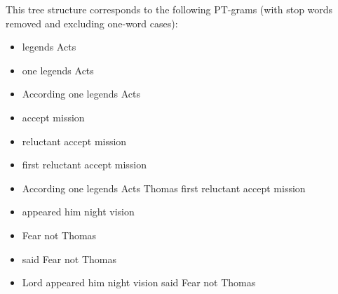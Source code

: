 \documentclass[12pt]{article}
\begin{document}
This tree structure corresponds to the following PT-grams
(with stop words removed and excluding one-word cases):

\begin{itemize}
\item legends Acts
\item one legends Acts
\item According one legends Acts
\item accept mission
\item reluctant accept mission
\item first reluctant accept mission 
\item According one legends Acts Thomas first reluctant accept mission 
\item appeared him night vision
\item Fear not Thomas
\item said Fear not Thomas
\item Lord appeared him night vision said Fear not Thomas
\end{itemize}
\end{document}
